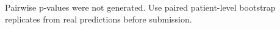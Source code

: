 Pairwise p-values were not generated. Use paired patient-level bootstrap replicates from real predictions before submission.
